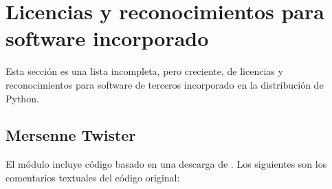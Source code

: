 \documentclass[a4,10pt,spanish]{sphinxmanual}
\begin{document}
\section{Licencias y reconocimientos para software incorporado}
\label{\detokenize{license:licenses-and-acknowledgements-for-incorporated-software}}\label{\detokenize{license:otherlicenses}}
\sphinxAtStartPar
Esta sección es una lista incompleta, pero creciente, de licencias y reconocimientos para software de terceros incorporado en la distribución de Python.


\subsection{Mersenne Twister}
\label{\detokenize{license:mersenne-twister}}
\sphinxAtStartPar
El módulo  incluye código basado en una descarga de . Los siguientes son los comentarios textuales del código original:
\end{document}
